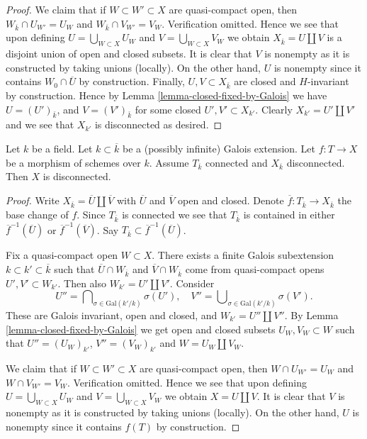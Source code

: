 \begin{proof}
\medskip\noindent
We claim that if $W \subset W' \subset X$ are quasi-compact
open, then $W_{\overline{k}} \cap U_{W'} = U_W$ and
$W_{\overline{k}} \cap V_{W'} = V_W$. Verification omitted.
Hence we see that upon defining $U = \bigcup_{W \subset X} U_W$
and $V = \bigcup_{W \subset X} V_W$ we obtain
$X_{\overline{k}} = U \amalg V$ is a disjoint union of open
and closed subsets.
It is clear that $V$ is nonempty as it is constructed by taking
unions (locally). On the other hand, $U$ is nonempty since it contains
$W_0 \cap \overline{U}$ by construction. Finally, $U, V \subset X_{\bar k}$
are closed and $H$-invariant by construction. Hence by
Lemma \ref{lemma-closed-fixed-by-Galois}
we have $U = (U')_{\bar k}$, and $V = (V')_{\bar k}$ for some
closed $U', V' \subset X_{k'}$. Clearly $X_{k'} = U' \amalg V'$
and we see that $X_{k'}$ is disconnected as desired.
\end{proof}

\begin{lemma}
\label{lemma-tricky}
Let $k$ be a field. Let $k \subset \overline{k}$ be a (possibly infinite)
Galois extension. Let $f : T \to X$ be a morphism of schemes over $k$.
Assume $T_{\overline{k}}$ connected and $X_{\overline{k}}$
disconnected. Then $X$ is disconnected.
\end{lemma}

\begin{proof}
Write $X_{\overline{k}} = \overline{U} \coprod \overline{V}$
with $\overline{U}$ and $\overline{V}$ open and closed.
Denote $\overline{f} : T_{\overline{k}} \to X_{\overline{k}}$ the base
change of $f$. Since $T_{\overline{k}}$ is connected we see that
$T_{\overline{k}}$ is contained in either $\overline{f}^{-1}(\overline{U})$
or $\overline{f}^{-1}(\overline{V})$.
Say $T_{\overline{k}} \subset \overline{f}^{-1}(\overline{U})$.

\medskip\noindent
Fix a quasi-compact open $W \subset X$. There exists a
finite Galois subextension $k \subset k' \subset \overline{k}$
such that $\overline{U} \cap W_{\overline{k}}$ and
$\overline{V} \cap W_{\overline{k}}$ come from quasi-compact
opens $U', V' \subset W_{k'}$. Then also $W_{k'} = U' \coprod V'$.
Consider
$$
U'' = \bigcap\nolimits_{\sigma \in \text{Gal}(k'/k)} \sigma(U'),
\quad
V'' = \bigcup\nolimits_{\sigma \in \text{Gal}(k'/k)} \sigma(V').
$$
These are Galois invariant, open and closed, and
$W_{k'} = U'' \coprod V''$.
By Lemma \ref{lemma-closed-fixed-by-Galois} we get open and closed subsets
$U_W, V_W \subset W$ such that
$U'' = (U_W)_{k'}$, $V'' = (V_W)_{k'}$ and
$W = U_W \coprod V_W$.

\medskip\noindent
We claim that if $W \subset W' \subset X$ are quasi-compact
open, then $W \cap U_{W'} = U_W$ and $W \cap V_{W'} = V_W$.
Verification omitted.
Hence we see that upon defining $U = \bigcup_{W \subset X} U_W$
and $V = \bigcup_{W \subset X} V_W$ we obtain $X = U \coprod V$.
It is clear that $V$ is nonempty as it is constructed by taking
unions (locally). On the other hand, $U$ is nonempty since it contains
$f(T)$ by construction.
\end{proof}

